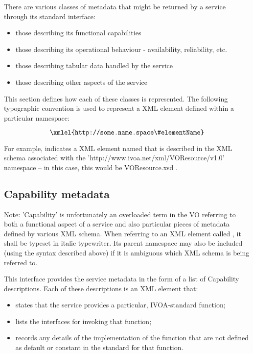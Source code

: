 \documentclass[11pt,letter]{ivoa}
\begin{document}
 There are various classes of metadata that might be returned by a
 service through its standard interface:

\begin{itemize}
\item those describing its functional capabilities
\item those describing its operational behaviour - availability, reliability, etc.
\item those describing tabular data handled by the service
\item those describing other aspects of the service 
\end{itemize}

This section defines how each of these classes is represented. The
following typographic convention is used to represent a XML element
defined within a particular namespace:

$$\hbox{\xmlel{http://some.name.space\#elementName}}$$

For example, 
indicates a XML element named  that is described in the
XML schema associated with the 'http://www.ivoa.net/xml/VOResource/v1.0'
namespace -- in this case, this would be VOResource.xsd
\citep{2018ivoa.spec.0625P}. 

\subsection{Capability metadata}

Note:
    'Capability' is unfortunately an overloaded term in the VO referring
    to both a functional aspect of a service and also particular pieces
    of metadata defined by various XML schema. When referring to an XML
    element called , it shall be typeset in italic
    typewriter. Its parent namespace may also be included (using the
    syntax described above) if it is ambiguous which XML schema is being
    referred to. 
    
This interface provides the service metadata in the form of a list of
Capability descriptions. Each of these descriptions is an XML element
that:

\begin{itemize}
\item states that the service provides a particular, IVOA-standard function;
\item lists the interfaces for invoking that function;
\item records any details of the implementation of the function that are
not defined as default or constant in the standard for that function. 
\end{itemize}
\end{document}
